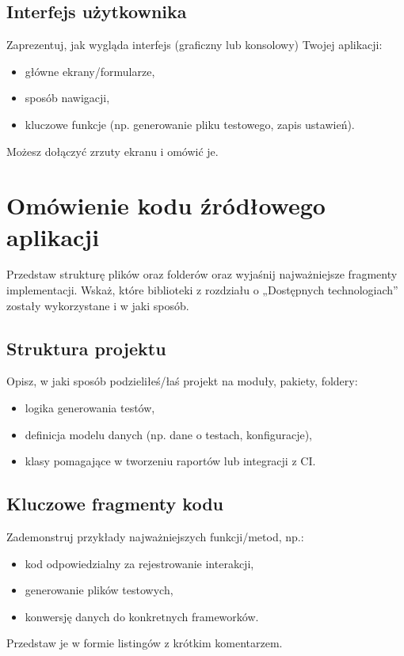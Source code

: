\documentclass[12pt]{report}
\begin{document}
\section{Interfejs użytkownika}
{Zaprezentuj, jak wygląda interfejs (graficzny lub konsolowy) Twojej aplikacji:
\begin{itemize}
    \item główne ekrany/formularze,
    \item sposób nawigacji,
    \item kluczowe funkcje (np. generowanie pliku testowego, zapis ustawień).
\end{itemize}
Możesz dołączyć zrzuty ekranu i omówić je.}

\chapter{Omówienie kodu źródłowego aplikacji}
{Przedstaw strukturę plików oraz folderów oraz wyjaśnij najważniejsze fragmenty implementacji. Wskaż, które biblioteki z rozdziału o „Dostępnych technologiach” zostały wykorzystane i w jaki sposób.}

\section{Struktura projektu}
{Opisz, w jaki sposób podzieliłeś/łaś projekt na moduły, pakiety, foldery:
\begin{itemize}
    \item logika generowania testów,
    \item definicja modelu danych (np. dane o testach, konfiguracje),
    \item klasy pomagające w tworzeniu raportów lub integracji z CI.
\end{itemize}}

\section{Kluczowe fragmenty kodu}
{Zademonstruj przykłady najważniejszych funkcji/metod, np.:
\begin{itemize}
    \item kod odpowiedzialny za rejestrowanie interakcji,
    \item generowanie plików testowych,
    \item konwersję danych do konkretnych frameworków.
\end{itemize}
Przedstaw je w formie listingów z krótkim komentarzem.}
\end{document}
